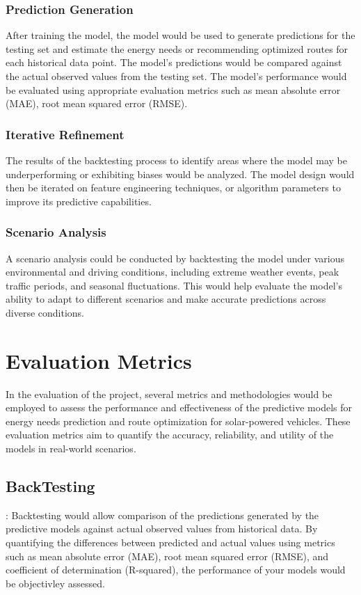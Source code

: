 \documentclass[10pt,twocolumn]{article}
\begin{document}
\subsubsection{Prediction Generation} After training the model, the model would be used to generate predictions for the testing set and estimate the energy needs or recommending optimized routes for each historical data point. The model's predictions would be compared against the actual observed values from the testing set. The model's performance would be evaluated using appropriate evaluation metrics such as mean absolute error (MAE), root mean squared error (RMSE). 

\subsubsection{Iterative Refinement}The results of the backtesting process to identify areas where the model may be underperforming or exhibiting biases would be analyzed. The model design would then be iterated on feature engineering techniques, or algorithm parameters to improve its predictive capabilities.

\subsubsection{Scenario Analysis} A scenario analysis could be conducted by backtesting the model under various environmental and driving conditions, including extreme weather events, peak traffic periods, and seasonal fluctuations. This would help evaluate the model's ability to adapt to different scenarios and make accurate predictions across diverse conditions.



\section{Evaluation Metrics}

In the evaluation of the project, several metrics and methodologies would be employed to assess the performance and effectiveness of the predictive models for energy needs prediction and route optimization for solar-powered vehicles. These evaluation metrics aim to quantify the accuracy, reliability, and utility of the models in real-world scenarios. 
\subsection{BackTesting}: Backtesting would allow comparison of the predictions generated by the predictive models against actual observed values from historical data. By quantifying the differences between predicted and actual values using metrics such as mean absolute error (MAE), root mean squared error (RMSE), and coefficient of determination (R-squared),  the performance of your models would be objectivley assessed. 
\end{document}
